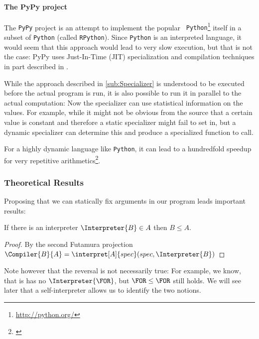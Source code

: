 \paragraph{The PyPy project} %
\label{par:The PyPy project}
\begin{example}
	The {\tt PyPy} project is an attempt to implement the popular {\tt
	Python}\footnote{\url{http://python.org/}} itself in a subset of {\tt Python}
	(called {\tt RPython}). Since {\tt Python} is an interpreted language, it
	would seem that this approach would lead to very slow execution, but that is
	not the case: PyPy uses Just-In-Time (JIT) specialization and compilation
	techniques in part described in \cite{psycho}.

	While the approach described in \ref{sub:Specializer} is understood to be 
	executed before the actual program is run, it is also possible to run it 
	in parallel to the actual computation: Now the specializer can use 
	statistical information on the values. For example, while it might not be 
	obvious from the source that a certain value is constant and therefore a 
	static specializer might fail to set in, but a dynamic specializer can 
	determine this and produce a specialized function to call.

	For a highly dynamic language like {\tt Python}, it can lead to a hundredfold 
	speedup for very repetitive arithmetics\footnote{\cite{psycho}}.
\end{example}


\subsubsection{Theoretical Results}
\label{ssub:spec theo}
Proposing that we can statically fix arguments in our program leads important results:
\begin{theorem}
	\label{thm:power-interpreter}
	If there is an interpreter $\Interpreter{B}\in A$ then $B\leq A$.
\end{theorem}
\begin{proof}
	By the second Futamura projection 
	$\Compiler{B}{A} = \interpret[A]{spec}(spec, \Interpreter{B})$
\end{proof}

Note however that the reversal is not necessarily true: For example, we know, that 
\FOR is has no $\Interpreter{\FOR}$, but $\FOR \leq \FOR$ still holds. We 
will see later that a self-interpreter allows us to identify the two notions.
